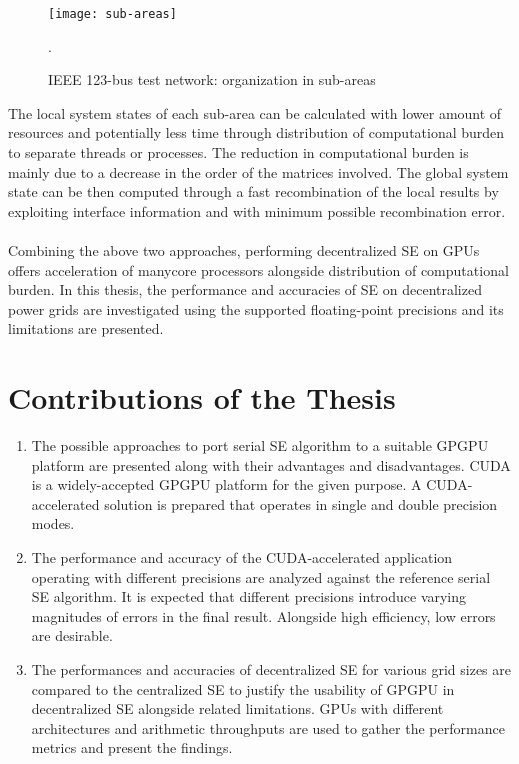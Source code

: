 \documentclass[thesis.tex]{subfiles}
\begin{document}
\begin{figure}[H]
	\centering
	\texttt{[image: sub-areas]}
	\caption{IEEE 123-bus test network: organization in sub-areas~\cite{Muscas}}.
	\label{fig:subareas}
\end{figure}

The local system states of each sub-area can be calculated with lower amount of resources and potentially less time through distribution of computational burden to separate threads or processes. The reduction in computational burden is mainly due to a decrease in the order of the matrices involved. The global system state can be then computed through a fast recombination of the local results by exploiting interface information and with minimum possible recombination error. \\\\
Combining the above two approaches, performing decentralized SE on GPUs offers acceleration of manycore processors alongside distribution of computational burden. In this thesis, the performance and accuracies of SE on decentralized power grids are investigated using the supported floating-point precisions and its limitations are presented. 


\section{Contributions of the Thesis} \label{bib:goals}
\begin{enumerate}
	\item The possible approaches to port serial SE algorithm to a suitable GPGPU platform are presented along with their advantages and disadvantages. CUDA is a widely-accepted GPGPU platform for the given purpose. A CUDA-accelerated solution is prepared that operates in single and double precision modes.
	\item The performance and accuracy of the CUDA-accelerated application operating with different precisions are analyzed against the reference serial SE algorithm. It is expected that different precisions introduce varying magnitudes of errors in the final result. Alongside high efficiency, low errors are desirable.
	\item The performances and accuracies of decentralized SE for various grid sizes are compared to the centralized SE to justify the usability of GPGPU in decentralized SE alongside related limitations. GPUs with different architectures and arithmetic throughputs are used to gather the performance metrics and present the findings.
\end{enumerate}
\end{document}
